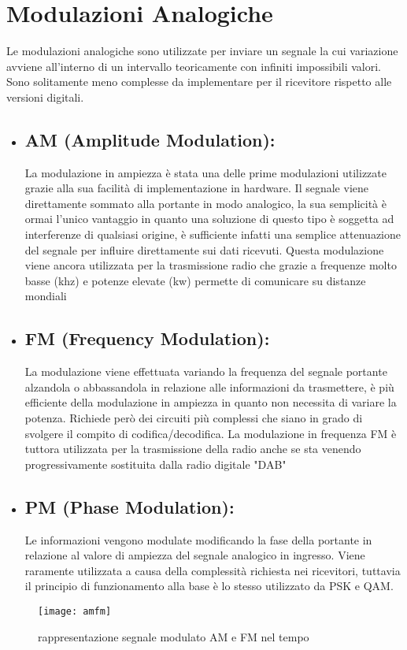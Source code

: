 \section{Modulazioni Analogiche}
Le modulazioni analogiche sono utilizzate per inviare un segnale la cui variazione avviene all'interno di un intervallo teoricamente con infiniti impossibili valori. Sono solitamente meno complesse da implementare per il ricevitore rispetto alle versioni digitali.
\label{sec:context}
\begin{itemize}
   	\item \subsection{AM (Amplitude Modulation): } La modulazione in ampiezza è stata una delle prime modulazioni utilizzate grazie alla sua facilità di implementazione in hardware. Il segnale viene direttamente sommato alla portante in modo analogico, la sua semplicità è ormai l'unico vantaggio in quanto una soluzione di questo tipo è soggetta ad interferenze di qualsiasi origine, è sufficiente infatti una semplice attenuazione del segnale per influire direttamente sui dati ricevuti. Questa modulazione viene ancora utilizzata per la trasmissione radio che grazie a frequenze molto basse (khz) e potenze elevate (kw) permette di comunicare su distanze mondiali
   \item \subsection{FM (Frequency Modulation): } La modulazione viene effettuata variando la frequenza del segnale portante alzandola o abbassandola in relazione alle informazioni da trasmettere, è più efficiente della modulazione in ampiezza in quanto non necessita di variare la potenza. Richiede però dei circuiti più complessi che siano in grado di svolgere il compito di codifica/decodifica. La modulazione in frequenza FM è tuttora utilizzata per la trasmissione della radio anche se sta venendo progressivamente sostituita dalla radio digitale "DAB"
   \item \subsection{PM (Phase Modulation): } Le informazioni vengono modulate modificando la fase della portante in relazione al valore di ampiezza del segnale analogico in ingresso. Viene raramente utilizzata a causa della complessità richiesta nei ricevitori, tuttavia il principio di funzionamento alla base è lo stesso utilizzato da PSK e QAM.
  \end{itemize}
\begin{figure}[h]
	\centering
	\texttt{[image: amfm]}
	\caption{rappresentazione segnale modulato AM e FM nel tempo}\label{fig:1}
\end{figure}



